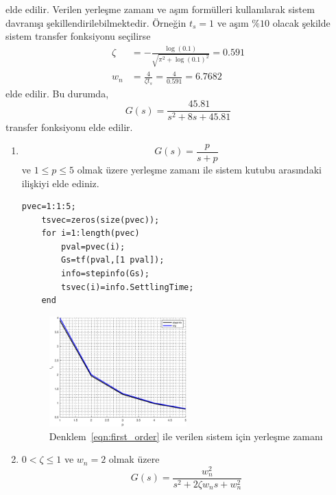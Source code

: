 elde edilir. Verilen yerleşme zamanı ve aşım formülleri kullanılarak sistem davranışı şekillendirilebilmektedir. Örneğin $t_s=1$ ve aşım $\%10$ olacak şekilde sistem transfer fonksiyonu seçilirse
\begin{equation} 
\begin{split} 
    \zeta&=-\frac{\log(0.1)}{\sqrt{\pi^2+\log(0.1)^2}}=0.591\\
    w_n&=\frac{4}{\zeta t_s}=\frac{4}{0.591}=6.7682
\end{split} 
\end{equation} 
elde edilir. Bu durumda,
\begin{equation} 
    G(s)=\frac{45.81}{s^2+8s+45.81}
\end{equation} 
transfer fonksiyonu elde edilir. 
\begin{enumerate}
    \item 
    \begin{equation}
        G(s)=\frac{p}{s+p}\label{eqn:first_order}
    \end{equation}
    ve $1\leq p\leq 5$ olmak üzere yerleşme zamanı ile sistem kutubu arasındaki ilişkiyi elde ediniz.
    \begin{lstlisting}[style=Matlab-editor]
    pvec=1:1:5;
    tsvec=zeros(size(pvec));
    for i=1:length(pvec)
        pval=pvec(i);
        Gs=tf(pval,[1 pval]);
        info=stepinfo(Gs);
        tsvec(i)=info.SettlingTime;
    end
    \end{lstlisting}
    \begin{figure}[!htb]
        \centering
        \includegraphics[width=0.5\textwidth]{img/lec4_plot1}
        \caption{Denklem~\ref{eqn:first_order} ile verilen sistem için yerleşme zamanı}
        \label{fig:lec4_plot1}
    \end{figure}
    \item $0<\zeta\leq1$ ve $w_n=2$ olmak üzere 
    \begin{equation}
        G(s)=\frac{w_n^2}{s^2+2\zeta w_ns+w_n^2}
        \label{eqn:second_order}
    \end{equation}

\end{enumerate}
